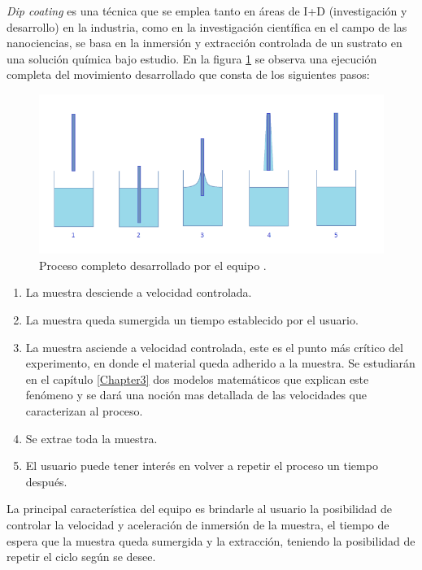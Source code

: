 \textit{Dip coating} es una técnica que se emplea tanto en áreas de I+D (investigación y desarrollo) en la industria, como en la investigación científica en el campo de las nanociencias, se basa en la inmersión y extracción  controlada de un sustrato en una solución química bajo estudio. En la figura \ref{fig:inmersion} se observa una ejecución completa del movimiento desarrollado que consta de los siguientes pasos:


\begin{figure}[htpb]
\centering 
\includegraphics[width=1\textwidth]{./Figures/dip-coating.png}
\caption{Proceso completo desarrollado por el equipo \protect\footnotemark.}
\label{fig:inmersion}
\end{figure}

\begin{enumerate}
\item La muestra desciende a velocidad controlada.
\item La muestra queda sumergida un tiempo establecido por el usuario.	
\item La muestra asciende a velocidad controlada, este es el punto más crítico del experimento, en donde el material queda adherido a la muestra. Se estudiarán en el capítulo \ref{Chapter3} dos modelos matemáticos que explican este fenómeno y se dará una noción mas detallada de las velocidades que caracterizan al proceso.
\item Se extrae toda la muestra.
\item El usuario puede tener interés en volver a repetir el proceso un tiempo después.
\end{enumerate} 
 
La principal característica del equipo es brindarle al usuario la posibilidad de controlar la velocidad y aceleración de inmersión de la muestra, el tiempo de espera que la muestra queda sumergida y la extracción, teniendo la posibilidad de repetir el ciclo según se desee.

